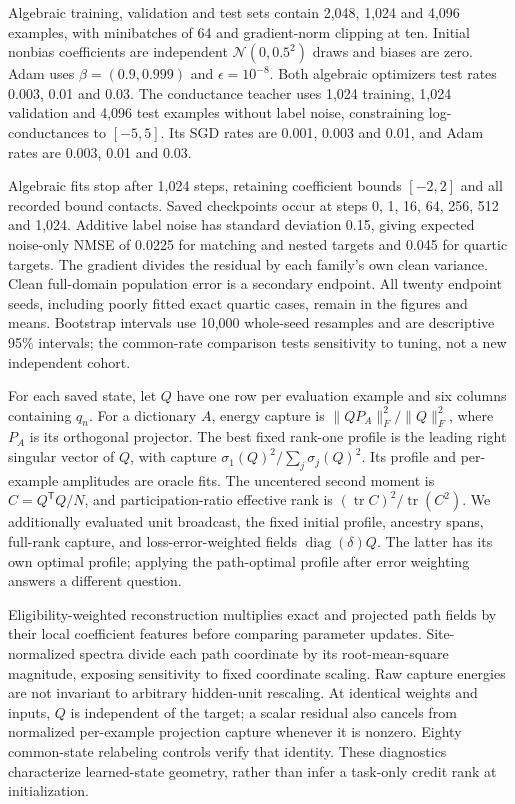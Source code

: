 Algebraic training, validation and test sets contain 2,048, 1,024 and 4,096 examples, with minibatches of 64 and gradient-norm clipping at ten. Initial nonbias coefficients are independent $\mathcal N(0,0.5^2)$ draws and biases are zero. Adam uses $\beta=(0.9,0.999)$ and $\epsilon=10^{-8}$. Both algebraic optimizers test rates 0.003, 0.01 and 0.03. The conductance teacher uses 1,024 training, 1,024 validation and 4,096 test examples without label noise, constraining log-conductances to $[-5,5]$. Its SGD rates are 0.001, 0.003 and 0.01, and Adam rates are 0.003, 0.01 and 0.03.

Algebraic fits stop after 1,024 steps, retaining coefficient bounds $[-2,2]$ and all recorded bound contacts. Saved checkpoints occur at steps 0, 1, 16, 64, 256, 512 and 1,024. Additive label noise has standard deviation 0.15, giving expected noise-only NMSE of 0.0225 for matching and nested targets and 0.045 for quartic targets. The gradient divides the residual by each family's own clean variance. Clean full-domain population error is a secondary endpoint. All twenty endpoint seeds, including poorly fitted exact quartic cases, remain in the figures and means. Bootstrap intervals use 10,000 whole-seed resamples and are descriptive 95\% intervals; the common-rate comparison tests sensitivity to tuning, not a new independent cohort.

For each saved state, let $Q$ have one row per evaluation example and six columns containing $q_n$. For a dictionary $A$, energy capture is $\|QP_A\|_F^2/\|Q\|_F^2$, where $P_A$ is its orthogonal projector. The best fixed rank-one profile is the leading right singular vector of $Q$, with capture $\sigma_1(Q)^2/\sum_j\sigma_j(Q)^2$. Its profile and per-example amplitudes are oracle fits. The uncentered second moment is $C=Q^{\mathsf T}Q/N$, and participation-ratio effective rank is $(\operatorname{tr}C)^2/\operatorname{tr}(C^2)$. We additionally evaluated unit broadcast, the fixed initial profile, ancestry spans, full-rank capture, and loss-error-weighted fields $\operatorname{diag}(\delta)Q$. The latter has its own optimal profile; applying the path-optimal profile after error weighting answers a different question.

Eligibility-weighted reconstruction multiplies exact and projected path fields by their local coefficient features before comparing parameter updates. Site-normalized spectra divide each path coordinate by its root-mean-square magnitude, exposing sensitivity to fixed coordinate scaling. Raw capture energies are not invariant to arbitrary hidden-unit rescaling. At identical weights and inputs, $Q$ is independent of the target; a scalar residual also cancels from normalized per-example projection capture whenever it is nonzero. Eighty common-state relabeling controls verify that identity. These diagnostics characterize learned-state geometry, rather than infer a task-only credit rank at initialization.

